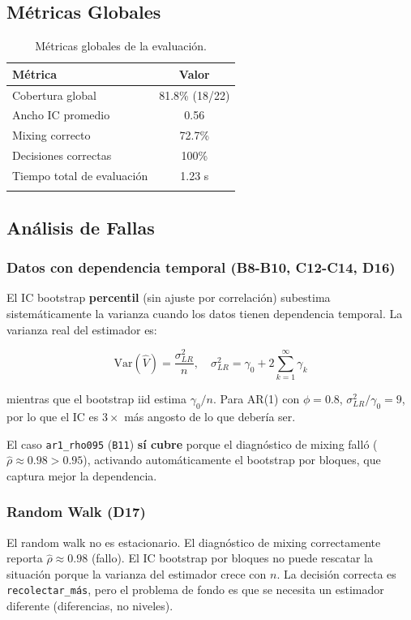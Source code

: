 \documentclass[12pt,a4paper]{article}
\begin{document}
\subsection{Métricas Globales}

\begin{longtable}{@{}lc@{}}
    \toprule
    Métrica & Valor \\
    \midrule
    \endhead
    Cobertura global & 81.8\% (18/22) \\
    Ancho IC promedio & 0.56 \\
    Mixing correcto & 72.7\% \\
    Decisiones correctas & 100\% \\
    Tiempo total de evaluación & 1.23 s \\
    \bottomrule
    \caption{Métricas globales de la evaluación.}
\end{longtable}

\subsection{Análisis de Fallas}

\subsubsection{Datos con dependencia temporal (B8-B10, C12-C14, D16)}

El IC bootstrap \textbf{percentil} (sin ajuste por correlación) subestima sistemáticamente la varianza cuando los datos tienen dependencia temporal. La varianza real del estimador es:

\[
\text{Var}(\hat{V}) = \frac{\sigma^2_{LR}}{n}, \quad \sigma^2_{LR} = \gamma_0 + 2\sum_{k=1}^{\infty} \gamma_k
\]

mientras que el bootstrap iid estima $\gamma_0 / n$. Para AR(1) con $\phi=0.8$, $\sigma^2_{LR} / \gamma_0 = 9$, por lo que el IC es $3\times$ más angosto de lo que debería ser.

El caso \texttt{ar1\_rho095} (\texttt{B11}) \textbf{sí cubre} porque el diagnóstico de mixing falló ($\hat{\rho} \approx 0.98 > 0.95$), activando automáticamente el bootstrap por bloques, que captura mejor la dependencia.

\subsubsection{Random Walk (D17)}

El random walk no es estacionario. El diagnóstico de mixing correctamente reporta $\hat{\rho} \approx 0.98$ (fallo). El IC bootstrap por bloques no puede rescatar la situación porque la varianza del estimador crece con $n$. La decisión correcta es \texttt{recolectar\_más}, pero el problema de fondo es que se necesita un estimador diferente (diferencias, no niveles).
\end{document}
